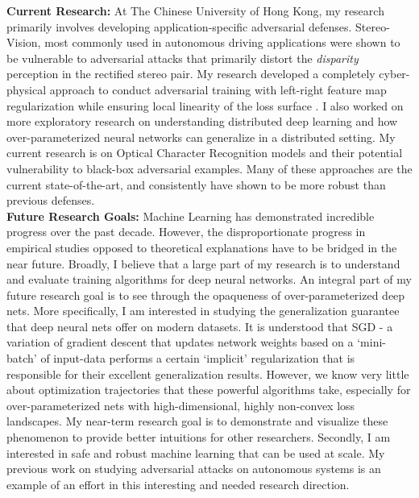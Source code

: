 \documentclass[12pt]{article}
\begin{document}
\textbf{Current Research:} At The Chinese University of Hong Kong, my research primarily involves developing application-specific adversarial defenses. Stereo-Vision, most commonly used in autonomous driving applications were shown to be vulnerable to adversarial attacks that primarily distort the \emph{disparity} perception in the rectified stereo pair. My research developed a completely cyber-physical approach to conduct adversarial training with left-right feature map regularization while ensuring local linearity of the loss surface \cite{me}. I also worked on more exploratory research on understanding distributed deep learning and how over-parameterized neural networks can generalize in a distributed setting. My current research is on Optical Character Recognition models and their potential vulnerability to black-box adversarial examples. Many of these approaches are the current state-of-the-art, and consistently have shown to be more robust than previous defenses.  \\

\textbf{Future Research Goals:} Machine Learning has demonstrated incredible progress over the past decade. However, the disproportionate progress in empirical studies opposed to theoretical explanations have to be bridged in the near future. Broadly, I believe that a large part of my research is to understand and evaluate training algorithms for deep neural networks. An integral part of my future research goal is to see through the opaqueness of over-parameterized deep nets. More specifically, I am interested in studying the generalization guarantee that deep neural nets offer on modern datasets. It is understood that SGD - a variation of gradient descent that updates network weights based on a `mini-batch' of input-data performs a certain `implicit' regularization that is responsible for their excellent generalization results. However, we know very little about optimization trajectories that these powerful algorithms take, especially for over-parameterized nets with high-dimensional, highly non-convex loss landscapes. My near-term research goal is to demonstrate and visualize these phenomenon to provide better intuitions for other researchers. Secondly, I am interested in safe and robust machine learning that can be used at scale. My previous work on studying adversarial attacks on autonomous systems is an example of an effort in this interesting and needed research direction. 


\end{document}
